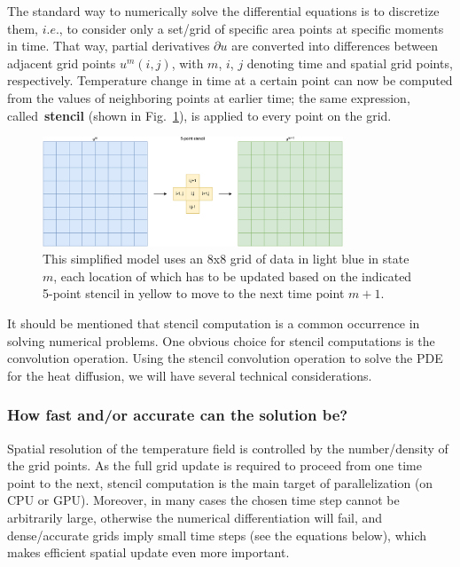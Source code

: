  
\par
The standard way to numerically solve the differential equations is to discretize them, $i.e.$, to consider only a set/grid of specific area points at specific moments in time.
That way, partial derivatives $\partial u$ are converted into differences between adjacent grid points $u^m(i,j)$, with $m$, $i$, $j$ denoting time and spatial grid points, respectively.
Temperature change in time at a certain point can now be computed from the values of neighboring points at earlier time; the same expression, called~\textbf{stencil} (shown in Fig.~\ref{fig:stencil}), is applied to every point on the grid.


\begin{figure}[!htbp]
\centering\includegraphics[width=0.8\textwidth]{fig_problem/stencil.jpg}
\caption{This simplified model uses an 8x8 grid of data in light blue in state $m$, each location of which has to be updated based on the indicated 5-point stencil in yellow to move to the next time point $m+1$.}\label{fig:stencil}
\end{figure}


\par
It should be mentioned that stencil computation is a common occurrence in solving numerical problems.
One obvious choice for stencil computations is the convolution operation.
Using the stencil convolution operation to solve the PDE for the heat diffusion, we will have several technical considerations.


\subsubsection{How fast and/or accurate can the solution be?}


\par
Spatial resolution of the temperature field is controlled by the number/density of the grid points.
As the full grid update is required to proceed from one time point to the next, stencil computation is the main target of parallelization (on CPU or GPU).
Moreover, in many cases the chosen time step cannot be arbitrarily large, otherwise the numerical differentiation will fail, and dense/accurate grids imply small time steps (see the equations below), which makes efficient spatial update even more important.


